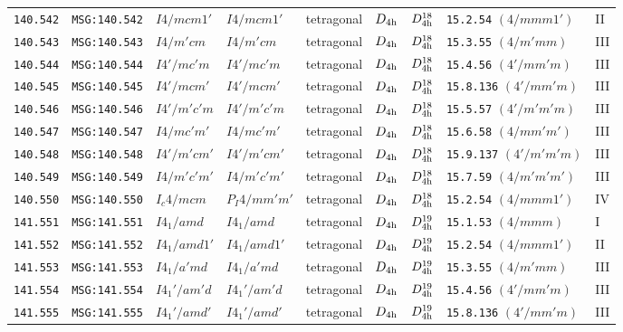 \documentclass[fleqn,10pt]{jsarticle}
\begin{document}
\begin{center}
\begin{longtable}{lllllllll}
\texttt{140.542} & \texttt{MSG:140.542} & $I4/mcm1'$ & $I4/mcm1'$ & tetragonal & $D_{\rm 4h}$ & $D_{\rm 4h}^{18}$ & \texttt{15.2.54} $(4/mmm1')$ & II \\
\texttt{140.543} & \texttt{MSG:140.543} & $I4/m'cm$ & $I4/m'cm$ & tetragonal & $D_{\rm 4h}$ & $D_{\rm 4h}^{18}$ & \texttt{15.3.55} $(4/m'mm)$ & III \\
\texttt{140.544} & \texttt{MSG:140.544} & $I4'/mc'm$ & $I4'/mc'm$ & tetragonal & $D_{\rm 4h}$ & $D_{\rm 4h}^{18}$ & \texttt{15.4.56} $(4'/mm'm)$ & III \\
\texttt{140.545} & \texttt{MSG:140.545} & $I4'/mcm'$ & $I4'/mcm'$ & tetragonal & $D_{\rm 4h}$ & $D_{\rm 4h}^{18}$ & \texttt{15.8.136} $(4'/mm'm)$ & III \\
\texttt{140.546} & \texttt{MSG:140.546} & $I4'/m'c'm$ & $I4'/m'c'm$ & tetragonal & $D_{\rm 4h}$ & $D_{\rm 4h}^{18}$ & \texttt{15.5.57} $(4'/m'm'm)$ & III \\
\texttt{140.547} & \texttt{MSG:140.547} & $I4/mc'm'$ & $I4/mc'm'$ & tetragonal & $D_{\rm 4h}$ & $D_{\rm 4h}^{18}$ & \texttt{15.6.58} $(4/mm'm')$ & III \\
\texttt{140.548} & \texttt{MSG:140.548} & $I4'/m'cm'$ & $I4'/m'cm'$ & tetragonal & $D_{\rm 4h}$ & $D_{\rm 4h}^{18}$ & \texttt{15.9.137} $(4'/m'm'm)$ & III \\
\texttt{140.549} & \texttt{MSG:140.549} & $I4/m'c'm'$ & $I4/m'c'm'$ & tetragonal & $D_{\rm 4h}$ & $D_{\rm 4h}^{18}$ & \texttt{15.7.59} $(4/m'm'm')$ & III \\
\texttt{140.550} & \texttt{MSG:140.550} & $I_{c}4/mcm$ & $P_{I}4/mm'm'$ & tetragonal & $D_{\rm 4h}$ & $D_{\rm 4h}^{18}$ & \texttt{15.2.54} $(4/mmm1')$ & IV \\ \hline
\texttt{141.551} & \texttt{MSG:141.551} & $I4_{1}/amd$ & $I4_{1}/amd$ & tetragonal & $D_{\rm 4h}$ & $D_{\rm 4h}^{19}$ & \texttt{15.1.53} $(4/mmm)$ & I \\
\texttt{141.552} & \texttt{MSG:141.552} & $I4_{1}/amd1'$ & $I4_{1}/amd1'$ & tetragonal & $D_{\rm 4h}$ & $D_{\rm 4h}^{19}$ & \texttt{15.2.54} $(4/mmm1')$ & II \\
\texttt{141.553} & \texttt{MSG:141.553} & $I4_{1}/a'md$ & $I4_{1}/a'md$ & tetragonal & $D_{\rm 4h}$ & $D_{\rm 4h}^{19}$ & \texttt{15.3.55} $(4/m'mm)$ & III \\
\texttt{141.554} & \texttt{MSG:141.554} & $I4_{1}'/am'd$ & $I4_{1}'/am'd$ & tetragonal & $D_{\rm 4h}$ & $D_{\rm 4h}^{19}$ & \texttt{15.4.56} $(4'/mm'm)$ & III \\
\texttt{141.555} & \texttt{MSG:141.555} & $I4_{1}'/amd'$ & $I4_{1}'/amd'$ & tetragonal & $D_{\rm 4h}$ & $D_{\rm 4h}^{19}$ & \texttt{15.8.136} $(4'/mm'm)$ & III \\

\end{longtable}
\end{center}
\end{document}
